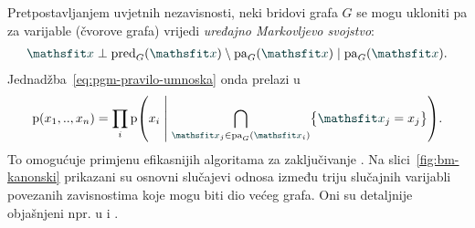 \documentclass[utf8, diplomski, lmodern]{fer}
\begin{document}
Pretpostavljanjem uvjetnih nezavisnosti, neki bridovi grafa $G$ se mogu ukloniti pa za varijable (čvorove grafa) vrijedi \emph{uređajno Markovljevo svojstvo}:
\begin{align}
\rvar x\perp \pred_G(\rvar x) \setminus \pa_G(\rvar x) \mid \pa_G(\rvar x).
\end{align}
Jednadžba~\eqref{eq:pgm-pravilo-umnoska} onda prelazi u 
\begin{align}
\p(x_1,..,x_n) 
= \prod_i\p\del{x_i \midmid \bigcap_{\rvar x_j\in\pa_G(\rvar x_i)}\cbr{\rvar x_j=x_j}} \text{.}
\label{eq:pgm-pravilo-umnoska}
\end{align} 
To omogućuje primjenu efikasnijih algoritama za zaključivanje \citep{Murphy:2012:MLPP}.
Na slici~\ref{fig:bm-kanonski} prikazani su osnovni slučajevi odnosa između triju slučajnih varijabli povezanih zavisnostima koje mogu biti dio većeg grafa. Oni su detaljnije objašnjeni npr. u \citet{Bishop:2006:PRML} i \citet{Alpaydin:2014:IML}. 
\end{document}
